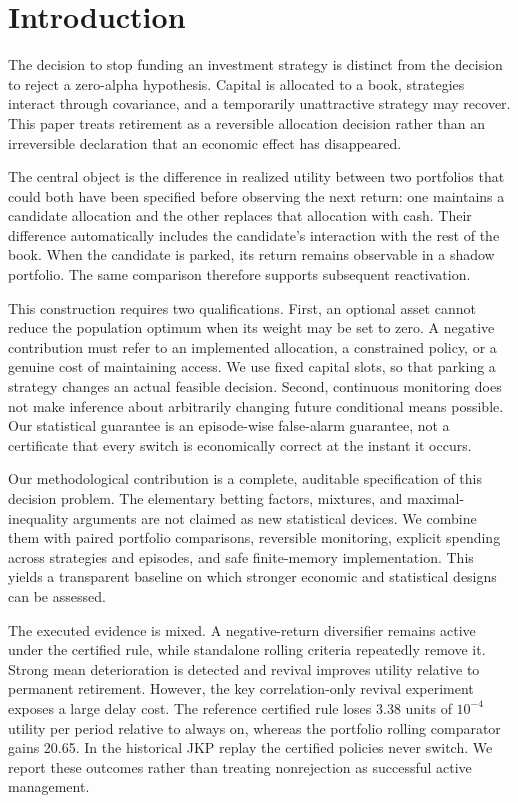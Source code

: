 \section{Introduction}
The decision to stop funding an investment strategy is distinct from the decision to reject a zero-alpha hypothesis. Capital is allocated to a book, strategies interact through covariance, and a temporarily unattractive strategy may recover. This paper treats retirement as a reversible allocation decision rather than an irreversible declaration that an economic effect has disappeared.

The central object is the difference in realized utility between two portfolios that could both have been specified before observing the next return: one maintains a candidate allocation and the other replaces that allocation with cash. Their difference automatically includes the candidate's interaction with the rest of the book. When the candidate is parked, its return remains observable in a shadow portfolio. The same comparison therefore supports subsequent reactivation.

This construction requires two qualifications. First, an optional asset cannot reduce the population optimum when its weight may be set to zero. A negative contribution must refer to an implemented allocation, a constrained policy, or a genuine cost of maintaining access. We use fixed capital slots, so that parking a strategy changes an actual feasible decision. Second, continuous monitoring does not make inference about arbitrarily changing future conditional means possible. Our statistical guarantee is an episode-wise false-alarm guarantee, not a certificate that every switch is economically correct at the instant it occurs.

Our methodological contribution is a complete, auditable specification of this decision problem. The elementary betting factors, mixtures, and maximal-inequality arguments are not claimed as new statistical devices. We combine them with paired portfolio comparisons, reversible monitoring, explicit spending across strategies and episodes, and safe finite-memory implementation. This yields a transparent baseline on which stronger economic and statistical designs can be assessed.

The executed evidence is mixed. A negative-return diversifier remains active under the certified rule, while standalone rolling criteria repeatedly remove it. Strong mean deterioration is detected and revival improves utility relative to permanent retirement. However, the key correlation-only revival experiment exposes a large delay cost. The reference certified rule loses 3.38 units of $10^{-4}$ utility per period relative to always on, whereas the portfolio rolling comparator gains 20.65. In the historical JKP replay the certified policies never switch. We report these outcomes rather than treating nonrejection as successful active management.

